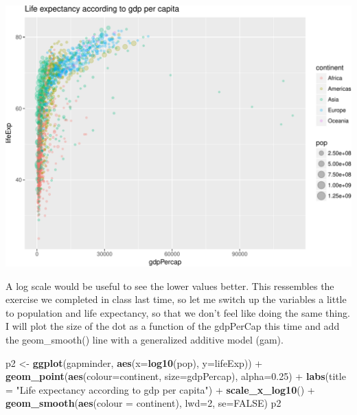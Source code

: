 \documentclass[]{article}
\newenvironment{Shaded}{\begin{snugshade}}{\end{snugshade}}
\newcommand{\KeywordTok}[1]{\textcolor[rgb]{0.13,0.29,0.53}{\textbf{{#1}}}}
\newcommand{\DataTypeTok}[1]{\textcolor[rgb]{0.13,0.29,0.53}{{#1}}}
\newcommand{\DecValTok}[1]{\textcolor[rgb]{0.00,0.00,0.81}{{#1}}}
\newcommand{\FloatTok}[1]{\textcolor[rgb]{0.00,0.00,0.81}{{#1}}}
\newcommand{\StringTok}[1]{\textcolor[rgb]{0.31,0.60,0.02}{{#1}}}
\newcommand{\OtherTok}[1]{\textcolor[rgb]{0.56,0.35,0.01}{{#1}}}
\newcommand{\NormalTok}[1]{{#1}}
\begin{document}
\includegraphics{gapminder-exploration-phase2_files/figure-latex/unnamed-chunk-15-1.pdf}

A log scale would be useful to see the lower values better. This
ressembles the exercise we completed in class last time, so let me
switch up the variables a little to population and life expectancy, so
that we don't feel like doing the same thing. I will plot the size of
the dot as a function of the gdpPerCap this time and add the
geom\_smooth() line with a generalized additive model (gam).

\begin{Shaded}
\begin{Highlighting}[]
\NormalTok{p2 <-}\StringTok{ }\KeywordTok{ggplot}\NormalTok{(gapminder, }\KeywordTok{aes}\NormalTok{(}\DataTypeTok{x=}\KeywordTok{log10}\NormalTok{(pop), }\DataTypeTok{y=}\NormalTok{lifeExp)) +}
\StringTok{  }\KeywordTok{geom_point}\NormalTok{(}\KeywordTok{aes}\NormalTok{(}\DataTypeTok{colour=}\NormalTok{continent, }\DataTypeTok{size=}\NormalTok{gdpPercap), }\DataTypeTok{alpha=}\FloatTok{0.25}\NormalTok{) +}
\StringTok{  }\KeywordTok{labs}\NormalTok{(}\DataTypeTok{title =} \StringTok{"Life expectancy according to gdp per capita"}\NormalTok{) +}
\StringTok{  }\KeywordTok{scale_x_log10}\NormalTok{() +}
\StringTok{  }\KeywordTok{geom_smooth}\NormalTok{(}\KeywordTok{aes}\NormalTok{(}\DataTypeTok{colour =} \NormalTok{continent), }\DataTypeTok{lwd=}\DecValTok{2}\NormalTok{, }\DataTypeTok{se=}\OtherTok{FALSE}\NormalTok{)}
\NormalTok{p2}
\end{Highlighting}
\end{Shaded}
\end{document}
